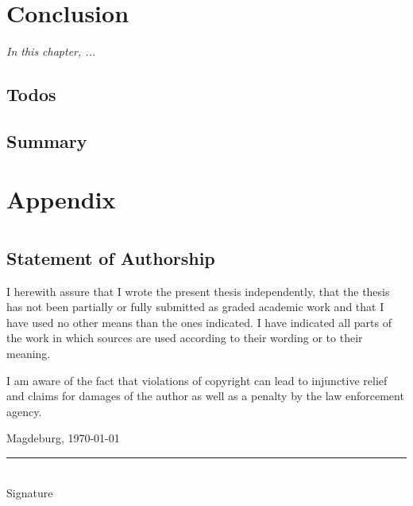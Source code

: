 \documentclass[
	12pt,
	a4paper,
	printlength,
	bibliography=totoc,
	chapterprefix,
	headings=openright,
	numbers=endperiod,
	parskip=half,
	twoside
 ]{scrreprt}
\begin{document}
\lipsum[2]

\chapter{Conclusion}
\label{cha:conclusion}

\textit{In this chapter, ...}

\section{Todos}


\lipsum[1-2]

\section*{Summary}

\lipsum[2]





\appendix

\chapter{Appendix}
\label{cha:appendix}

\chapter*{}

\section*{Statement of Authorship}

I herewith assure that I wrote the present thesis independently, that the thesis has not been partially or fully submitted as graded academic work and that I have used no other means than the ones indicated.
I have indicated all parts of the work in which sources are used according to their wording or to their meaning.

I am aware of the fact that violations of copyright can lead to injunctive relief and claims for damages of the author as well as a penalty by the law enforcement agency.

\bigskip

Magdeburg, \today

\bigskip
\bigskip

\rule{0.5\textwidth}{0.5pt}\\
\hspace*{0.25em}Signature
\end{document}
